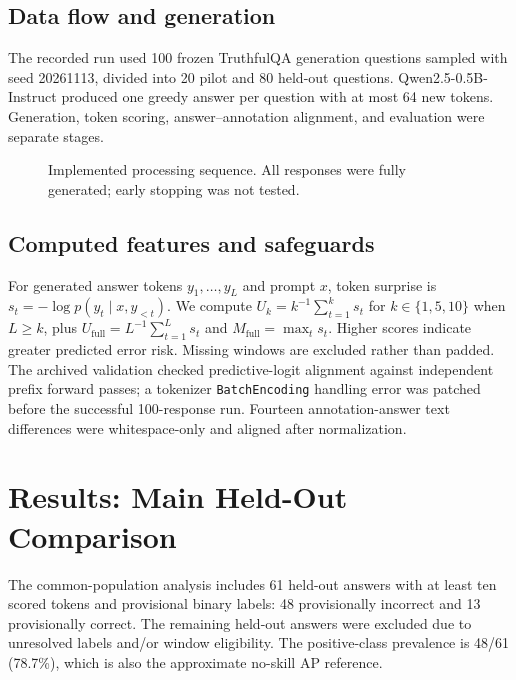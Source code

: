 \documentclass[runningheads]{llncs}
\begin{document}
\subsection{Data flow and generation}
The recorded run used 100 frozen TruthfulQA generation questions sampled with seed 20261113, divided into 20 pilot and 80 held-out questions. Qwen2.5-0.5B-Instruct produced one greedy answer per question with at most 64 new tokens. Generation, token scoring, answer--annotation alignment, and evaluation were separate stages.
\begin{figure}[t]\centering
{}
\caption{Implemented processing sequence. All responses were fully generated; early stopping was not tested.}\label{fig:arch}\end{figure}
\subsection{Computed features and safeguards}
For generated answer tokens $y_1,\ldots,y_L$ and prompt $x$, token surprise is $s_t=-\log p(y_t\mid x,y_{<t})$. We compute $U_k=k^{-1}\sum_{t=1}^{k}s_t$ for $k\in\{1,5,10\}$ when $L\geq k$, plus $U_{\mathrm{full}}=L^{-1}\sum_{t=1}^L s_t$ and $M_{\mathrm{full}}=\max_t s_t$. Higher scores indicate greater predicted error risk. Missing windows are excluded rather than padded. The archived validation checked predictive-logit alignment against independent prefix forward passes; a tokenizer \texttt{BatchEncoding} handling error was patched before the successful 100-response run. Fourteen annotation-answer text differences were whitespace-only and aligned after normalization.
\section{Results: Main Held-Out Comparison}
The common-population analysis includes 61 held-out answers with at least ten scored tokens and provisional binary labels: 48 provisionally incorrect and 13 provisionally correct. The remaining held-out answers were excluded due to unresolved labels and/or window eligibility. The positive-class prevalence is 48/61 (78.7\%), which is also the approximate no-skill AP reference.
\end{document}

